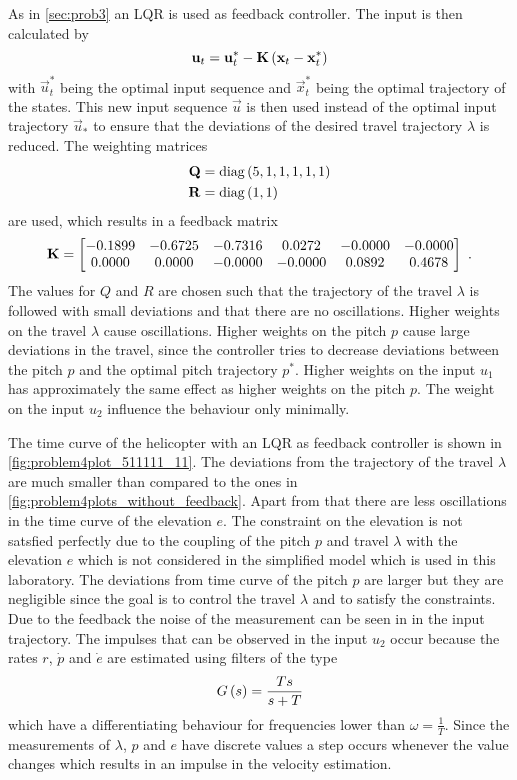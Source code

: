 As in \cref{sec:prob3} an LQR is used as feedback controller. The input is then calculated by
\begin{equation}
\mathbf{u}_t=\mathbf{u}_t^*-\mathbf{K}\left(\mathbf{x}_t-\mathbf{x}_t^*\right)
\end{equation}
with $\vec{u}_t^*$ being the optimal input sequence and $\vec{x}_t^*$ being the optimal trajectory of the states. This new input sequence $\vec{u}$ is then used instead of the optimal input trajectory $\vec{u}_*$ to ensure that the deviations of the desired travel trajectory $\lambda$ is reduced. The weighting matrices 
\begin{subequations}
	\begin{align}
	\mathbf{Q}&=\mathrm{diag}\left(5,1,1,1,1,1\right)\\
	\mathbf{R}&=\mathrm{diag}\left(1,1\right)
	\end{align}
\end{subequations}
are used, which results in a feedback matrix
\begin{equation}
\vec{K}=\begin{bmatrix}
-0.1899  & -0.6725  & -0.7316  &  0.0272  & -0.0000  & -0.0000\\
0.0000   & 0.0000   & -0.0000  & -0.0000  & 0.0892   & 0.4678
\end{bmatrix}\FullStop
\end{equation}
The values for $Q$ and $R$ are chosen such that the trajectory of the travel $\lambda$ is followed with small deviations and that there are no oscillations. Higher weights on the travel $\lambda$ cause oscillations. Higher weights on the pitch $p$ cause large deviations in the travel, since the controller tries to decrease deviations between the pitch $p$ and the optimal pitch trajectory $p^*$. Higher weights on the input $u_1$ has approximately the same effect as higher weights on the pitch $p$. The weight on the input $u_2$ influence the behaviour only minimally.

The time curve of the helicopter with an LQR as feedback controller is shown in \cref{fig:problem4plot_511111_11}. The deviations from the trajectory of the travel $\lambda$ are much smaller than compared to the ones in \cref{fig:problem4plots_without_feedback}. Apart from that there are less oscillations in the time curve of the elevation $e$. The constraint on the elevation is not satsfied perfectly due to the coupling of the pitch $p$ and travel $\lambda$ with the elevation $e$ which is not considered in the simplified model which is used in this laboratory. The deviations from time curve of the pitch $p$ are larger but they are negligible since the goal is to control the travel $\lambda$ and to satisfy the constraints. Due to the feedback the noise of the measurement can be seen in in the input trajectory. The impulses that can be observed in the input $u_2$ occur because the rates $r$, $\dot{p}$ and $\dot{e}$ are estimated using filters of the type 
\begin{equation}
G\left(s\right)=\frac{Ts}{s+T}
\end{equation}
which have a differentiating behaviour for frequencies lower than $\omega=\frac{1}{T}$. Since the measurements of $\lambda$, $p$ and $e$ have discrete values a step occurs whenever the value changes which results in an impulse in the velocity estimation.

